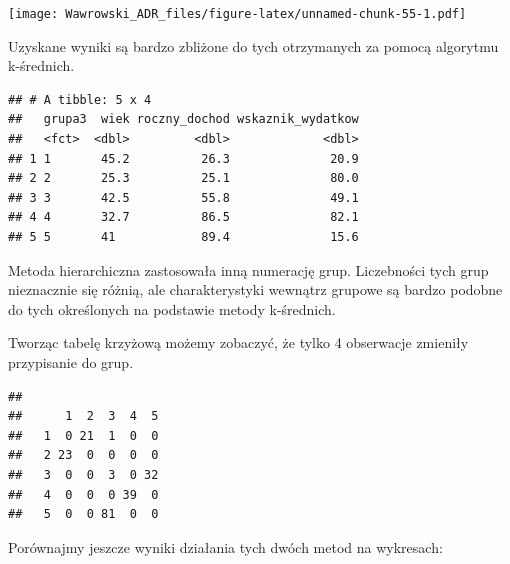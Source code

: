 \documentclass[
]{book}
\newenvironment{Shaded}{\begin{snugshade}}{\end{snugshade}}
\newcommand{\DataTypeTok}[1]{\textcolor[rgb]{0.13,0.29,0.53}{#1}}
\newcommand{\KeywordTok}[1]{\textcolor[rgb]{0.13,0.29,0.53}{\textbf{#1}}}
\newcommand{\NormalTok}[1]{#1}
\newcommand{\OperatorTok}[1]{\textcolor[rgb]{0.81,0.36,0.00}{\textbf{#1}}}
\newcommand{\StringTok}[1]{\textcolor[rgb]{0.31,0.60,0.02}{#1}}
\begin{document}
\texttt{[image: Wawrowski\_ADR\_files/figure-latex/unnamed-chunk-55-1.pdf]}

Uzyskane wyniki są bardzo zbliżone do tych otrzymanych za pomocą algorytmu k-średnich.

\begin{Shaded}
\end{Shaded}

\begin{verbatim}
## # A tibble: 5 x 4
##   grupa3  wiek roczny_dochod wskaznik_wydatkow
##   <fct>  <dbl>         <dbl>             <dbl>
## 1 1       45.2          26.3              20.9
## 2 2       25.3          25.1              80.0
## 3 3       42.5          55.8              49.1
## 4 4       32.7          86.5              82.1
## 5 5       41            89.4              15.6
\end{verbatim}

Metoda hierarchiczna zastosowała inną numerację grup. Liczebności tych grup nieznacznie się różnią, ale charakterystyki wewnątrz grupowe są bardzo podobne do tych określonych na podstawie metody k-średnich.

Tworząc tabelę krzyżową możemy zobaczyć, że tylko 4 obserwacje zmieniły przypisanie do grup.

\begin{Shaded}
\end{Shaded}

\begin{verbatim}
##    
##      1  2  3  4  5
##   1  0 21  1  0  0
##   2 23  0  0  0  0
##   3  0  0  3  0 32
##   4  0  0  0 39  0
##   5  0  0 81  0  0
\end{verbatim}

Porównajmy jeszcze wyniki działania tych dwóch metod na wykresach:
\end{document}
